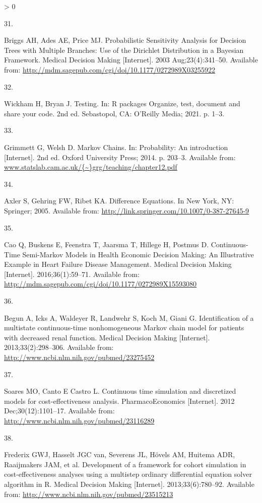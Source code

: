 \documentclass[
]{article}
\newlength{\cslhangindent}
\newlength{\csllabelwidth}
\newenvironment{CSLReferences}[2] %
 {%
  \setlength{\parindent}{0pt}
  \ifodd #1 \everypar{\setlength{\hangindent}{\cslhangindent}}\ignorespaces\fi
  \ifnum #2 > 0
  \setlength{\parskip}{#2\baselineskip}
  \fi
 }%
 {}
\newcommand{\CSLLeftMargin}[1]{\parbox[t]{\csllabelwidth}{#1}}
\newcommand{\CSLRightInline}[1]{\parbox[t]{\linewidth - \csllabelwidth}{#1}\break}
\begin{document}
\begin{CSLReferences}{0}{0}
\leavevmode\hypertarget{ref-Briggs2003}{}%
\CSLLeftMargin{31. }
\CSLRightInline{Briggs AH, Ades AE, Price MJ. {Probabilistic Sensitivity Analysis for Decision Trees with Multiple Branches: Use of the Dirichlet Distribution in a Bayesian Framework}. Medical Decision Making {[}Internet{]}. 2003 Aug;23(4):341--50. Available from: \url{http://mdm.sagepub.com/cgi/doi/10.1177/0272989X03255922}}

\leavevmode\hypertarget{ref-Wickham2021}{}%
\CSLLeftMargin{32. }
\CSLRightInline{Wickham H, Bryan J. {Testing}. In: R packages Organize, test, document and share your code. 2nd ed. Sebastopol, CA: O'Reilly Media; 2021. p. 1--3. }

\leavevmode\hypertarget{ref-Grimmett2014}{}%
\CSLLeftMargin{33. }
\CSLRightInline{Grimmett G, Welsh D. {Markov Chains}. In: Probability: An introduction {[}Internet{]}. 2nd ed. Oxford University Press; 2014. p. 203--3. Available from: \href{https://www.statslab.cam.ac.uk/\%7B~\%7Dgrg/teaching/chapter12.pdf}{www.statslab.cam.ac.uk/\{\textasciitilde\}grg/teaching/chapter12.pdf}}

\leavevmode\hypertarget{ref-Axler2005}{}%
\CSLLeftMargin{34. }
\CSLRightInline{Axler S, Gehring FW, Ribet KA. {Difference Equations}. In New York, NY: Springer; 2005. Available from: \url{http://link.springer.com/10.1007/0-387-27645-9}}

\leavevmode\hypertarget{ref-Cao2016}{}%
\CSLLeftMargin{35. }
\CSLRightInline{Cao Q, Buskens E, Feenstra T, Jaarsma T, Hillege H, Postmus D. {Continuous-Time Semi-Markov Models in Health Economic Decision Making: An Illustrative Example in Heart Failure Disease Management}. Medical Decision Making {[}Internet{]}. 2016;36(1):59--71. Available from: \url{http://mdm.sagepub.com/cgi/doi/10.1177/0272989X15593080}}

\leavevmode\hypertarget{ref-Begun2013}{}%
\CSLLeftMargin{36. }
\CSLRightInline{Begun A, Icks A, Waldeyer R, Landwehr S, Koch M, Giani G. {Identification of a multistate continuous-time nonhomogeneous Markov chain model for patients with decreased renal function.} Medical Decision Making {[}Internet{]}. 2013;33(2):298--306. Available from: \url{http://www.ncbi.nlm.nih.gov/pubmed/23275452}}

\leavevmode\hypertarget{ref-Soares2012}{}%
\CSLLeftMargin{37. }
\CSLRightInline{Soares MO, Canto E Castro L. {Continuous time simulation and discretized models for cost-effectiveness analysis}. PharmacoEconomics {[}Internet{]}. 2012 Dec;30(12):1101--17. Available from: \url{http://www.ncbi.nlm.nih.gov/pubmed/23116289}}

\leavevmode\hypertarget{ref-Frederix2013a}{}%
\CSLLeftMargin{38. }
\CSLRightInline{Frederix GWJ, Hasselt JGC van, Severens JL, Hövels AM, Huitema ADR, Raaijmakers JAM, et al. {Development of a framework for cohort simulation in cost-effectiveness analyses using a multistep ordinary differential equation solver algorithm in R.} Medical Decision Making {[}Internet{]}. 2013;33(6):780--92. Available from: \url{http://www.ncbi.nlm.nih.gov/pubmed/23515213}}

\end{CSLReferences}
\end{document}
